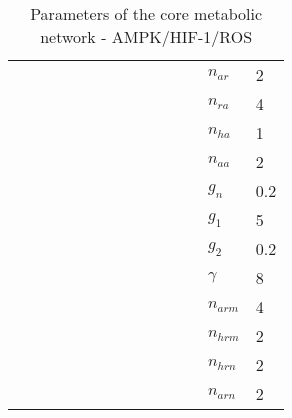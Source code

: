 \documentclass{article}
\begin{document}
\begin{table}[ht]
\begin{tabular}{ll|ll|ll|ll|ll|ll|ll}
                &       &               &               &               &               &               &       &               &       &               &               & $n_{ar}$      & 2     \\
                &       &               &               &               &               &               &       &               &       &               &               & $n_{ra}$      & 4     \\
                &       &               &               &               &               &               &       &               &       &               &               & $n_{ha}$      & 1     \\
                &       &               &               &               &               &               &       &               &       &               &               & $n_{aa}$      & 2     \\
                &       &               &               &               &               &               &       &               &       &               &               & $g_n$         & 0.2   \\
                &       &               &               &               &               &               &       &               &       &               &               & $g_1$         & 5     \\
                &       &               &               &               &               &               &       &               &       &               &               & $g_2$         & 0.2   \\
                &       &               &               &               &               &               &       &               &       &               &               & $\gamma$      & 8     \\
                &       &               &               &               &               &               &       &               &       &               &               & $n_{arm}$     & 4     \\
                &       &               &               &               &               &               &       &               &       &               &               & $n_{hrm}$     & 2     \\
                &       &               &               &               &               &               &       &               &       &               &               & $n_{hrn}$     & 2     \\
                &       &               &               &               &               &               &       &               &       &               &               & $n_{arn}$     & 2     \\

\end{tabular}
\caption{Parameters of the core metabolic network - AMPK/HIF-1/ROS}
\label{table:mparams}
\end{table}
\end{document}

